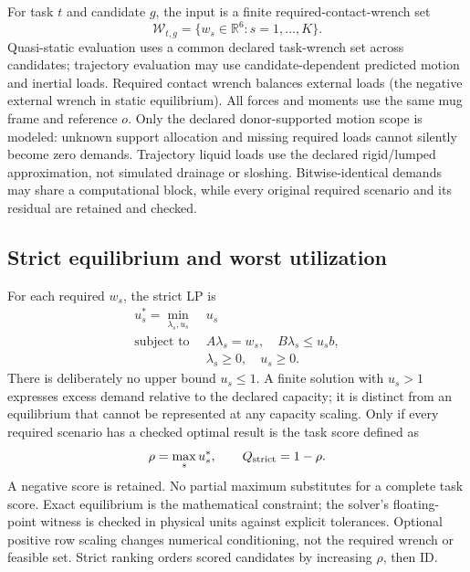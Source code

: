 \documentclass{article}
\begin{document}
For task $t$ and candidate $g$, the input is a finite required-contact-wrench set
\begin{equation}
 \mathcal W_{t,g}=\{w_s\in\mathbb R^6:s=1,\ldots,K\}.
\label{eq:demands}
\end{equation}
Quasi-static evaluation uses a common declared task-wrench set across candidates; trajectory evaluation may use candidate-dependent predicted motion and inertial loads. Required contact wrench balances external loads (the negative external wrench in static equilibrium). All forces and moments use the same mug frame and reference $o$. Only the declared donor-supported motion scope is modeled: unknown support allocation and missing required loads cannot silently become zero demands. Trajectory liquid loads use the declared rigid/lumped approximation, not simulated drainage or sloshing. Bitwise-identical demands may share a computational block, while every original required scenario and its residual are retained and checked.

\subsection{Strict equilibrium and worst utilization}
For each required $w_s$, the strict LP is
\begin{equation}
 \begin{aligned}
 u_s^*=\min_{\lambda_s,u_s}\;&u_s\\
 \text{subject to }&A\lambda_s=w_s,\quad B\lambda_s\le u_s b,\\
 &\lambda_s\ge0,\quad u_s\ge0.
 \end{aligned}
\label{eq:strict}
\end{equation}
There is deliberately no upper bound $u_s\le1$. A finite solution with $u_s>1$ expresses excess demand relative to the declared capacity; it is distinct from an equilibrium that cannot be represented at any capacity scaling. Only if every required scenario has a checked optimal result is the task score defined as
\begin{equation}
 \rho=\max_s u_s^*,\qquad Q_{\rm strict}=1-\rho.
\label{eq:strict-score}
\end{equation}
A negative score is retained. No partial maximum substitutes for a complete task score. Exact equilibrium is the mathematical constraint; the solver's floating-point witness is checked in physical units against explicit tolerances. Optional positive row scaling changes numerical conditioning, not the required wrench or feasible set. Strict ranking orders scored candidates by increasing $\rho$, then ID.
\end{document}
